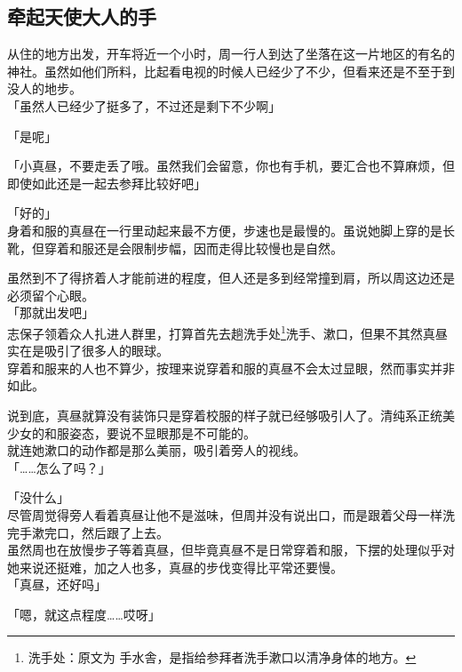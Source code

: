 \subsection{牵起天使大人的手}

从住的地方出发，开车将近一个小时，周一行人到达了坐落在这一片地区的有名的神社。虽然如他们所料，比起看电视的时候人已经少了不少，但看来还是不至于到没人的地步。\\

「虽然人已经少了挺多了，不过还是剩下不少啊」

「是呢」

「小真昼，不要走丢了哦。虽然我们会留意，你也有手机，要汇合也不算麻烦，但即使如此还是一起去参拜比较好吧」

「好的」\\

身着和服的真昼在一行里动起来最不方便，步速也是最慢的。虽说她脚上穿的是长靴，但穿着和服还是会限制步幅，因而走得比较慢也是自然。

虽然到不了得挤着人才能前进的程度，但人还是多到经常撞到肩，所以周这边还是必须留个心眼。\\

「那就出发吧」\\

志保子领着众人扎进人群里，打算首先去趟洗手处\footnote{洗手处：原文为 {\jpfont 手水舎}，是指给参拜者洗手漱口以清净身体的地方。}洗手、漱口，但果不其然真昼实在是吸引了很多人的眼球。\\

穿着和服来的人也不算少，按理来说穿着和服的真昼不会太过显眼，然而事实并非如此。

说到底，真昼就算没有装饰只是穿着校服的样子就已经够吸引人了。清纯系正统美少女的和服姿态，要说不显眼那是不可能的。\\

就连她漱口的动作都是那么美丽，吸引着旁人的视线。\\

「……怎么了吗？」

「没什么」\\

尽管周觉得旁人看着真昼让他不是滋味，但周并没有说出口，而是跟着父母一样洗完手漱完口，然后跟了上去。\\

虽然周也在放慢步子等着真昼，但毕竟真昼不是日常穿着和服，下摆的处理似乎对她来说还挺难，加之人也多，真昼的步伐变得比平常还要慢。\\

「真昼，还好吗」

「嗯，就这点程度……哎呀」\\

